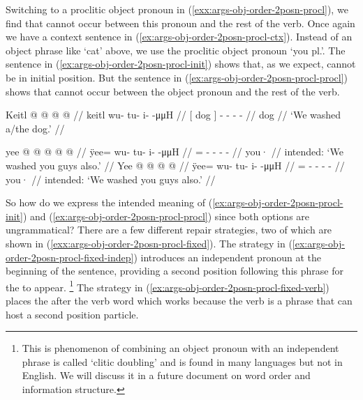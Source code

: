 Switching to a proclitic object pronoun in (\ref{exx:args-obj-order-2posn-procl}), we find that  cannot occur between this pronoun and the rest of the verb.
Once again we have a context sentence in (\ref{ex:args-obj-order-2posn-procl-ctx}).
Instead of an object phrase like  ‘cat’ above, we use the proclitic object pronoun  ‘you pl.’.
The sentence in (\ref{ex:args-obj-order-2posn-procl-init}) shows that, as we expect,  cannot be in initial position.
But the sentence in (\ref{ex:args-obj-order-2posn-procl-procl}) shows that  cannot occur between the object pronoun  and the rest of the verb.

\ex\label{ex:args-obj-order-2posn-procl-ctx}%
%
\begingl
	\gla	{} Keitl {}  @ {} @ {} @ {} @ {} //
	\glb	{} keitl {} wu- tu- i-  -μμH //
	\glc	{}[ dog {}] - - -  - //
	\gld	{} dog {}  {} {} {} {} //
	\glft	‘We washed a/the dog.’
		//
\endgl
\xe

\pex\label{exx:args-obj-order-2posn-procl}%
\a\label{ex:args-obj-order-2posn-procl-init}%
%
\ljudge{*}%
\begingl
	\gla	{} yee @  @ {} @ {} @ {} @ {} //
	\glb	{} ÿee= wu- tu- i-  -μμH //
	\glc	{} = - - -  - //
	\gld	{} you·  {} {} {} {} //
	\glft	intended: ‘We washed you guys also.’
		//
\endgl
\a\label{ex:args-obj-order-2posn-procl-procl}%
%
\ljudge{*}%
\begingl
	\gla	Yee   @ {} @ {} @ {} @ {} //
	\glb	ÿee=  wu- tu- i-  -μμH //
	\glc	{}=  - - -  - //
	\gld	you·   {} {} {} {} //
	\glft	intended: ‘We washed you guys also.’
		//
\endgl
\xe

So how do we express the intended meaning of (\ref{ex:args-obj-order-2posn-procl-init}) and (\ref{ex:args-obj-order-2posn-procl-procl}) since both options are ungrammatical?
There are a few different repair strategies, two of which are shown in (\ref{exx:args-obj-order-2posn-procl-fixed}).
The strategy in (\ref{ex:args-obj-order-2posn-procl-fixed-indep}) introduces an independent pronoun at the beginning of the sentence, providing a second position following this phrase for the  to appear.%
\footnote{This is phenomenon of combining an object pronoun with an independent phrase is called ‘clitic doubling’ and is found in many languages but not in English. We will discuss it in a future document on word order and information structure.}
The strategy in (\ref{ex:args-obj-order-2posn-procl-fixed-verb}) places the  after the verb word which works because the verb is a phrase that can host a second position particle.

